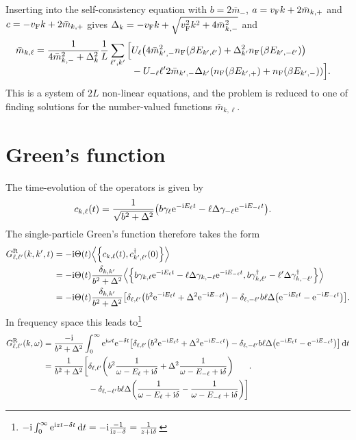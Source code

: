 \documentclass[english, parskip=full]{scrartcl}
\begin{document}
Inserting into the self-consistency equation with $b=2\bar{m}_-$, $a=v_{\text{F}} k + 2\bar{m}_{k,+}$ and $c=-v_{\text{F}} k + 2\bar{m}_{k,+}$ gives $\Delta_k = -v_{\text{F}} k + \sqrt{v_{\text{F}}^2 k^2 + 4\bar{m}_{k,-}^2}$ and
\begin{align}
\bar{m}_{k,\ell} &= \frac{1}{4\bar{m}_{k,-}^2 + \Delta_k^2} \frac{1}{L} \sum_{\ell',k'} \bsplit{\klb[\Big]{ &U_\ell \kla*{4\bar{m}_{k',-}^2 n_\F(\beta E_{k',\ell'}) + \Delta_{k'}^2 n_\F(\beta E_{k',-\ell'})} \\
&- U_{-\ell} \ell' 2\bar{m}_{k',-} \Delta_{k'} \kla*{n_\F(\beta E_{k',+}) + n_\F(\beta E_{k',-})} }.}
\end{align}
This is a system of $2L$ non-linear equations, and the problem is reduced to one of finding solutions for the number-valued functions $\bar{m}_{k,\ell}$.
\section{Green's function}
The time-evolution of the operators is given by
\begin{align}
c_{k,\ell}(t) &= \frac{1}{\sqrt{b^2+\Delta^2}} \kla*{b\gamma_\ell \powe{-\i E_\ell t} - \ell\Delta \gamma_{-\ell} \powe{-\i E_{-\ell} t}}.
\end{align}
The single-particle Green's function therefore takes the form
\begin{align}
G_{\ell,\ell'}^\R(k,k',t) &= -\i\Theta(t) \bra*{\klc*{c_{k,\ell}(t), c_{k',\ell'}^\dagger(0)}}\\
&= -\i\Theta(t) \frac{\delta_{k,k'}}{b^2+\Delta^2} \bra*{ \klc*{b\gamma_{k,\ell} \powe{-\i E_\ell t} - \ell\Delta \gamma_{k,-\ell} \powe{-\i E_{-\ell} t}, b\gamma_{k,\ell'}^\dagger - \ell'\Delta \gamma_{k,-\ell'}^\dagger} }\\
&= -\i\Theta(t) \frac{\delta_{k,k'}}{b^2+\Delta^2} \klb*{\delta_{\ell,\ell'} \kla*{b^2\powe{-\i E_\ell t} + \Delta^2 \powe{-\i E_{-\ell} t}} - \delta_{\ell,-\ell'} b\ell \Delta \kla*{\powe{-\i E_\ell t} - \powe{-\i E_{-\ell} t}}}.
\end{align}
In frequency space this leads to\footnote{$-\text{i}\int_{0}^{\infty} \text{e}^{\text{i} zt - \delta t} \,\mathrm{d}t = -\text{i} \frac{-1}{\text{i} z - \delta} = \frac{1}{z+\text{i}\delta}$}
\begin{align}
G_{\ell,\ell'}^\R(k,\omega) &= \frac{-\i}{b^2+\Delta^2} \intx{0}{\infty}{\powe{\i\omega t} \powe{-\delta t} \klb*{\delta_{\ell,\ell'} \kla*{b^2\powe{-\i E_\ell t} + \Delta^2 \powe{-\i E_{-\ell} t}} - \delta_{\ell,-\ell'} b\ell \Delta \kla*{\powe{-\i E_\ell t} - \powe{-\i E_{-\ell} t}}} }{t}\\
&= \frac{1}{b^2+\Delta^2} \bsplit{\klb[\bigg]{&\delta_{\ell,\ell'} \kla*{b^2\frac{1}{\omega - E_{\ell} + \i\delta} + \Delta^2 \frac{1}{\omega - E_{-\ell} + \i\delta}} \\
&- \delta_{\ell,-\ell'} b\ell \Delta \kla*{\frac{1}{\omega - E_{\ell} + \i\delta} - \frac{1}{\omega - E_{-\ell} + \i\delta}}}}.
\end{align}
\end{document}
